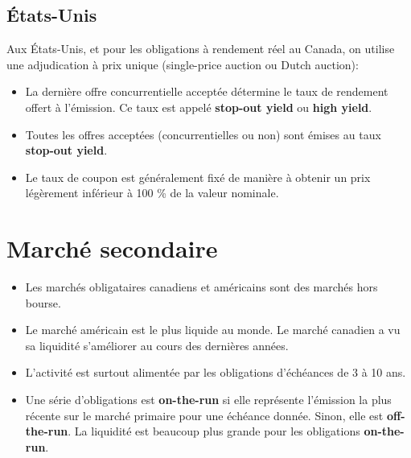 \documentclass[12pt]{article}
\begin{document}
\subsection{États-Unis}
Aux États-Unis, et pour les obligations à rendement réel au Canada, on utilise une adjudication à prix unique (single-price auction ou Dutch auction):  
\begin{itemize}
\item La dernière offre concurrentielle acceptée détermine le taux de rendement offert à l’émission.  Ce taux est appelé \textbf{stop-out yield} ou \textbf{high yield}.
\item Toutes les offres acceptées (concurrentielles ou non) sont émises au taux \textbf{stop-out yield}.
\item Le taux de coupon est généralement fixé de manière à obtenir un prix légèrement inférieur à 100 \% de la valeur nominale.  
\end{itemize}

\section{Marché secondaire}
\begin{itemize}
\item Les marchés obligataires canadiens et américains sont des marchés hors bourse.  
\item Le marché américain est le plus liquide au monde.  Le marché canadien a vu sa liquidité s’améliorer au cours des dernières années.  
\item L’activité est surtout alimentée par les obligations d’échéances de 3 à 10 ans.  
\item Une série d’obligations est \textbf{on-the-run} si elle représente l’émission la plus récente sur le marché primaire pour une échéance donnée.  Sinon, elle est \textbf{off-the-run}.  La liquidité est beaucoup plus grande pour les obligations \textbf{on-the-run}.  
\end{itemize}
\end{document}
